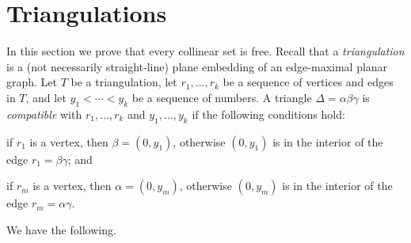 \section{Triangulations}



In this section we prove that every collinear set is free. Recall that a {\em triangulation} is a (not necessarily straight-line) plane embedding of an edge-maximal planar graph. Let $T$ be a triangulation, let $r_1,\ldots,r_k$ be a sequence of vertices and edges in $T$, and let $y_1<\cdots<y_k$ be a sequence of numbers. A triangle $\Delta=\alpha\beta\gamma$ is \emph{compatible} with $r_1,\ldots,r_k$ and $y_1,\ldots,y_k$ if the following conditions hold:
\begin{compactenum}
	\item if $r_1$ is a vertex, then $\beta=(0,y_1)$, otherwise $(0, y_1)$ is in the interior of the edge $r_1=\beta\gamma$; and
	\item if $r_m$ is a vertex, then $\alpha=(0,y_m)$, otherwise $(0,y_m)$ is in the interior
	of the edge $r_m=\alpha\gamma$.
\end{compactenum}


We have the following.

